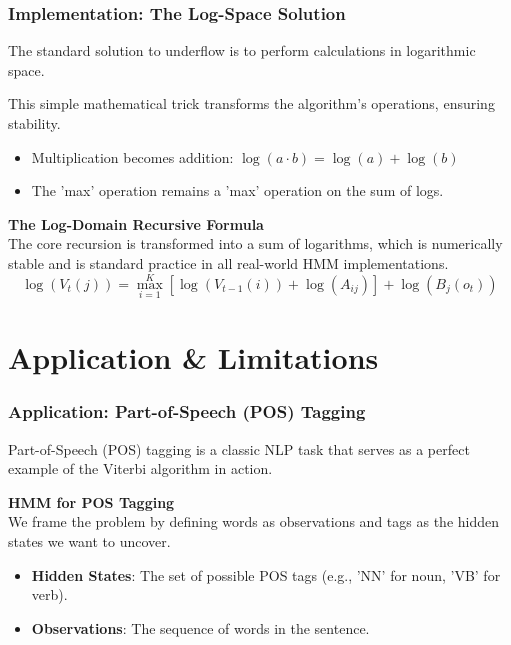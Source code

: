 \documentclass[aspectratio=43, 9pt]{beamer}
\begin{document}
\begin{frame}
    \frametitle{Implementation: The Log-Space Solution}
    The standard solution to underflow is to perform calculations in logarithmic space.
    
    \vspace{1em}
    
    This simple mathematical trick transforms the algorithm's operations, ensuring stability.
    \begin{itemize}
        \item Multiplication becomes addition: $\log(a \cdot b) = \log(a) + \log(b)$
        \item The 'max' operation remains a 'max' operation on the sum of logs.
    \end{itemize}
    
    \begin{Takeaway}
        \textbf{The Log-Domain Recursive Formula} \\
        The core recursion is transformed into a sum of logarithms, which is numerically stable and is standard practice in all real-world HMM implementations.
        $$\log(V_t(j)) = \max_{i=1}^K [\log(V_{t-1}(i)) + \log(A_{ij})] + \log(B_j(o_t))$$
    \end{Takeaway}
\end{frame}


\section{Application \& Limitations}

\begin{frame}
    \frametitle{Application: Part-of-Speech (POS) Tagging}
    Part-of-Speech (POS) tagging is a classic NLP task that serves as a perfect example of the Viterbi algorithm in action.
    
    \vspace{1em}
    
    \begin{NewDefinition}
        \textbf{HMM for POS Tagging} \\
        We frame the problem by defining words as observations and tags as the hidden states we want to uncover.
        \begin{itemize}
            \item \textbf{Hidden States}: The set of possible POS tags (e.g., 'NN' for noun, 'VB' for verb).
            \item \textbf{Observations}: The sequence of words in the sentence.
        \end{itemize}
    \end{NewDefinition}
\end{frame}
\end{document}

